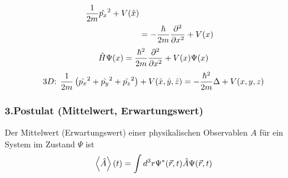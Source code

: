 \begin{bem}
\begin{bei}
\begin{align*}
                                \frac{1}{2m}\hat{p_x}^2 + V(\hat{x}) \\
                    &= -\frac{\hbar}{2m}\frac{\partial^2}{\partial x^2}+V(x)
            \end{align*}
            \begin{equation*}
                \hat{H}\Psi(x) = \frac{\hbar^2}{2m}\frac{\partial^2}{\partial x^2}+V(x)\Psi(x)
            \end{equation*}
            \begin{equation*}
                \text{$3D$: } \frac{1}{2m}\left( \hat{p_x}^2 + \hat{p_y}^2 + \hat{p_z}^2
                \right) + V (\hat{x},\hat{y},\hat{z}) = - \frac{\hbar^2}{2m} \Delta + V (x,y,z)
            \end{equation*}
    \end{bei}
\end{bem}
\subsubsection{3.Postulat (Mittelwert, Erwartungswert)} %
\label{ssub:3.Postulat_(Mittelwert,_Erwartungswert)}
Der Mittelwert (Erwartungswert) einer physikalischen Observablen $A$ für ein
System im Zustand $\Psi$ ist
\begin{equation*}
    \left\langle \hat{A} \right\rangle(t) = \int d^3r \Psi^* (\vec{r},t) \hat{A} \Psi(\vec{r},t)
\end{equation*}

